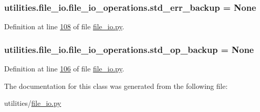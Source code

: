 \hypertarget{classutilities_1_1file__io_1_1file__io__operations_a979e9173080e7b88f0c296409a26ac01}{}
\subsubsection[{std\+\_\+err\+\_\+backup}]{\setlength{\rightskip}{0pt plus 5cm}utilities.\+file\+\_\+io.\+file\+\_\+io\+\_\+operations.\+std\+\_\+err\+\_\+backup = None\hspace{0.3cm}{\ttfamily [static]}}\label{classutilities_1_1file__io_1_1file__io__operations_a979e9173080e7b88f0c296409a26ac01}


Definition at line \hyperlink{file__io_8py_source_l00108}{108} of file \hyperlink{file__io_8py_source}{file\+\_\+io.\+py}.

\hypertarget{classutilities_1_1file__io_1_1file__io__operations_ae84964a620a018ec377b7e53f241dbf7}{}
\subsubsection[{std\+\_\+op\+\_\+backup}]{\setlength{\rightskip}{0pt plus 5cm}utilities.\+file\+\_\+io.\+file\+\_\+io\+\_\+operations.\+std\+\_\+op\+\_\+backup = None\hspace{0.3cm}{\ttfamily [static]}}\label{classutilities_1_1file__io_1_1file__io__operations_ae84964a620a018ec377b7e53f241dbf7}


Definition at line \hyperlink{file__io_8py_source_l00106}{106} of file \hyperlink{file__io_8py_source}{file\+\_\+io.\+py}.



The documentation for this class was generated from the following file\+:\begin{DoxyCompactItemize}
\item 
utilities/\hyperlink{file__io_8py}{file\+\_\+io.\+py}\end{DoxyCompactItemize}
